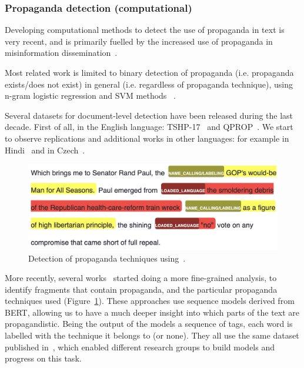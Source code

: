 \subsubsection{Propaganda detection (computational)}
\label{ssec:lit_propaganda_detection}

Developing computational methods to detect the use of propaganda in text is very recent, and is primarily fuelled by the increased use of propaganda in misinformation dissemination~\citep{da2020survey}.

Most related work is limited to binary detection of propaganda (i.e. propaganda exists/does not exist) in general (i.e. regardless of propaganda technique), using n-gram logistic regression and SVM methods ~\citep{rashkin2017truth,barron2019proppy}.


Several datasets for document-level detection have been released during the last decade.
First of all, in the English language:
TSHP-17~\citep{rashkin2017truth} and
QPROP~\citep{alberto_barron_cedeno_2019_3271522}.
We start to observe replications and additional works in other languages: for example in Hindi~\citep{chaudhari2022h,chaudhari_deptii_2022_5828240}
and in Czech~\citep{baisa2019benchmark}.

\begin{figure}[!htb]
    \centering
    \includegraphics[width=\linewidth]{figures/propaganda_example_1_color.png}
    \caption{Detection of propaganda techniques using~\citet{baly2020we}.%
    }
    \label{fig:propaganda_example_1}
\end{figure}

More recently, several works~\citep{da2019fine,yoosuf2019fine,vorakitphan2022protect} started doing a more fine-grained analysis, to identify fragments that contain propaganda, and the particular propaganda techniques used (Figure~\ref{fig:propaganda_example_1}).
These approaches use sequence models derived from BERT, allowing us to have a much deeper insight into which parts of the text are propagandistic. Being the output of the models a sequence of tags, each word is labelled with the technique it belongs to (or none).
They all use the same dataset published in~\cite{da2019fine}, which enabled different research groups to build models and progress on this task.


